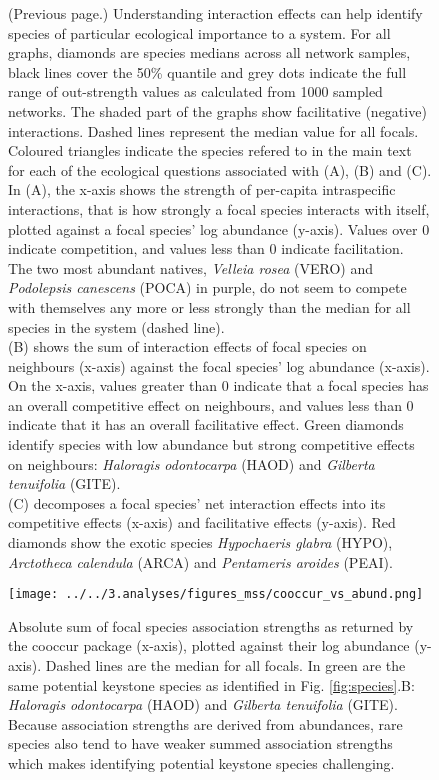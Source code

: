 \documentclass[a4,12pt]{article}
\begin{document}
    \addtocounter{figure}{-1}
    \begin{figure} [t!]
        \caption{(Previous page.) Understanding interaction effects can help identify species of particular ecological importance to a system. For all graphs, diamonds are species medians across all network samples, black lines cover the 50\% quantile and grey dots indicate the full range of out-strength values as calculated from 1000 sampled networks. The shaded part of the graphs show facilitative (negative) interactions. Dashed lines represent the median value for all focals. Coloured triangles indicate the species refered to in the main text for each of the ecological questions associated with (A), (B) and (C). \\
        In (A), the x-axis shows the strength of per-capita intraspecific interactions, that is how strongly a focal species interacts with itself, plotted against a focal species' log abundance (y-axis). Values over $0$ indicate competition, and values less than $0$ indicate facilitation.  The two most abundant natives, \textit{Velleia rosea} (VERO) and \textit{Podolepsis canescens} (POCA) in purple, do not seem to compete with themselves any more or less strongly than the median for all species in the system (dashed line). \\
        (B) shows the sum of interaction effects of focal species on neighbours (x-axis) against the focal species' log abundance (x-axis). On the x-axis, values greater than $0$ indicate that a focal species has an overall competitive effect on neighbours, and values less than $0$ indicate that it has an overall facilitative effect. Green diamonds identify species with low abundance but strong competitive effects on neighbours: \textit{Haloragis odontocarpa} (HAOD) and \textit{Gilberta tenuifolia} (GITE). \\
        (C) decomposes a focal species' net interaction effects into its competitive effects (x-axis) and facilitative effects (y-axis). Red diamonds show the exotic species \textit{Hypochaeris glabra} (HYPO), \textit{Arctotheca calendula} (ARCA) and \textit{Pentameris aroides} (PEAI).} 
    \end{figure}

\clearpage
\newpage

    \begin{figure}[H]
        \begin{centering}
        \texttt{[image: ../../3.analyses/figures\_mss/cooccur\_vs\_abund.png]}
        \caption{Absolute sum of focal species association strengths as returned by the cooccur package (x-axis), plotted against their log abundance (y-axis). Dashed lines are the median for all focals. In green are the same potential keystone species as identified in Fig. \ref{fig:species}.B: \textit{Haloragis odontocarpa} (HAOD) and \textit{Gilberta tenuifolia} (GITE). Because association strengths are derived from abundances, rare species also tend to have weaker summed association strengths which makes identifying potential keystone species challenging.}
        \label{fig:coocab}
        \end{centering}
    \end{figure} 
\end{document}

